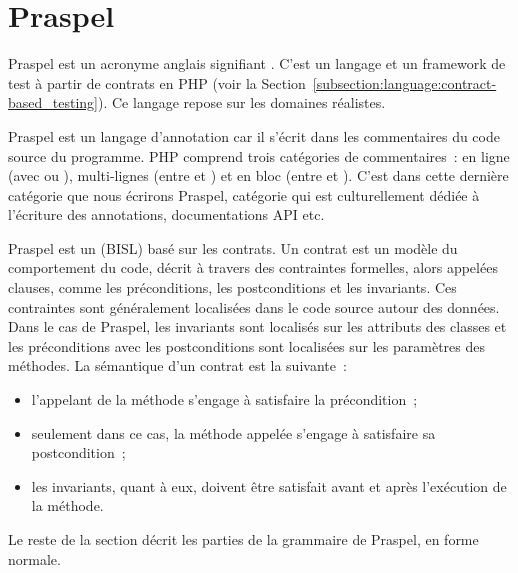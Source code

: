 \def\gsep{$\quad::=\quad$}
\def\mvert{$\;\;|\;\;$}
\newcommand{\token}[1]{\underline{\code{php-#1}}}
\newcommand{\grule}[1]{\textit{#1}}

\section{Praspel}
\label{section:language:praspel}

Praspel est un acronyme anglais signifiant . C'est un langage et un framework de test à partir
de contrats en PHP (voir la
Section~\ref{subsection:language:contract-based_testing}). Ce langage repose sur
les domaines réalistes.

Praspel est un {\strong langage d'annotation} car il s'écrit dans les
commentaires du code source du programme. PHP comprend trois catégories de
commentaires~: en ligne (avec \code{//} ou \code{\#}), multi-lignes (entre
\code{/*} et \code{*/}) et en bloc (entre \code{/**} et \code{*/}). C'est dans
cette dernière catégorie que nous écrirons Praspel, catégorie qui est
culturellement dédiée à l'écriture des annotations, documentations API etc.

Praspel est un  (BISL)
basé sur les contrats. Un {\strong contrat} est un modèle du comportement du
code, décrit à travers des contraintes formelles, alors appelées clauses, comme
les préconditions, les postconditions et les invariants. Ces contraintes sont
généralement localisées dans le code source autour des données. Dans le cas de
Praspel, les invariants sont localisés sur les attributs des classes et les
préconditions avec les postconditions sont localisées sur les paramètres des
méthodes. La sémantique d'un contrat est la suivante~:

\begin{itemize}

\item l'appelant de la méthode s'engage à satisfaire la précondition~;

\item seulement dans ce cas, la méthode appelée s'engage à satisfaire sa
postcondition~;

\item les invariants, quant à eux, doivent être satisfait avant et après
l'exécution de la méthode.

\end{itemize}

Le reste de la section décrit les parties de la grammaire de Praspel, en forme
normale.

